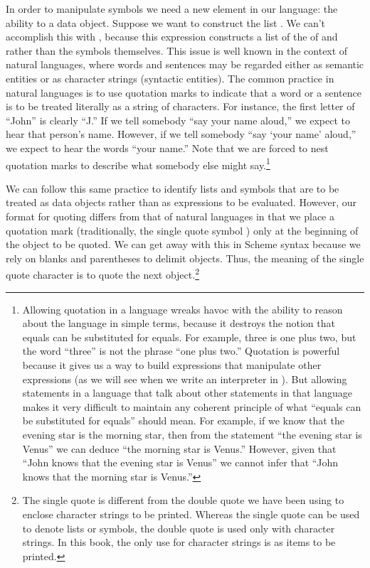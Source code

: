 \noindent
In order to manipulate symbols we need a new element in our language: the
ability to  a data object.  Suppose we want to construct the
list .  We can't accomplish this with , because
this expression constructs a list of the  of  and
 rather than the symbols themselves.  This issue is well known in the
context of natural languages, where words and sentences may be regarded either
as semantic entities or as character strings (syntactic entities).  The common
practice in natural languages is to use quotation marks to indicate that a word
or a sentence is to be treated literally as a string of characters.  For
instance, the first letter of ``John'' is clearly ``J.''  If we tell somebody
``say your name aloud,'' we expect to hear that person's name.  However, if we
tell somebody ``say `your name' aloud,'' we expect to hear the words ``your
name.''  Note that we are forced to nest quotation marks to describe what
somebody else might say.\footnote{Allowing quotation in a language wreaks havoc
with the ability to reason about the language in simple terms, because it
destroys the notion that equals can be substituted for equals.  For example,
three is one plus two, but the word ``three'' is not the phrase ``one plus
two.''  Quotation is powerful because it gives us a way to build expressions
that manipulate other expressions (as we will see when we write an interpreter
in ). But allowing statements in a language that talk about
other statements in that language makes it very difficult to maintain any
coherent principle of what ``equals can be substituted for equals'' should
mean.  For example, if we know that the evening star is the morning star, then
from the statement ``the evening star is Venus'' we can deduce ``the morning
star is Venus.''  However, given that ``John knows that the evening star is
Venus'' we cannot infer that ``John knows that the morning star is Venus.''}

We can follow this same practice to identify lists and symbols that are to be
treated as data objects rather than as expressions to be evaluated.  However,
our format for quoting differs from that of natural languages in that we place
a quotation mark (traditionally, the single quote symbol ) only at the
beginning of the object to be quoted.  We can get away with this in Scheme
syntax because we rely on blanks and parentheses to delimit objects.  Thus, the
meaning of the single quote character is to quote the next object.\footnote{The
single quote is different from the double quote we have been using to enclose
character strings to be printed.  Whereas the single quote can be used to
denote lists or symbols, the double quote is used only with character strings.
In this book, the only use for character strings is as items to be printed.}


